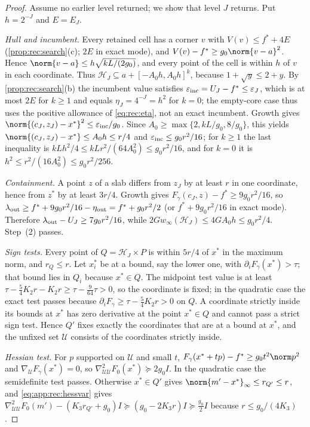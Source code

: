 \begin{proof}
Assume no earlier level returned; we show that level $J$ returns. Put
$h=2^{-J}$ and $E=E_J$.

\emph{Hull and incumbent.} Every retained cell has a corner $v$ with
$V(v)\le f^*+4E$ (\cref{prop:rec:search}(c); $2E$ in exact mode), and
$V(v)-f^*\ge g_0\norm{v-a}^2$. Hence
$\norm{v-a}\le h\sqrt{kL/(2g_0)}$, and every point of the cell is within
$h$ of $v$ in each coordinate. Thus $\mathcal H_J\subseteq a+[-A_0h,A_0h]^k$,
because $1+\sqrt y\le2+y$. By \cref{prop:rec:search}(b) the incumbent
value satisfies $\varepsilon_{\rm inc}=U_J-f^*\le\varepsilon_J$, which is at
most $2E$ for $k\ge1$ and equals $\eta_J=4^{-J}=h^2$ for $k=0$; the empty-core
case thus uses the positive allowance of \eqref{eq:rec:eta}, not an exact
incumbent. Growth gives
$\norm{(c_J,z_J)-x^*}^2\le\varepsilon_{\rm inc}/g_0$. Since
$A_0\ge\max\{2,kL/g_0,8/g_0\}$, this yields $\norm{(c_J,z_J)-x^*}\le A_0h\le r/4$
and $\varepsilon_{\rm inc}\le g_0r^2/16$; for $k\ge1$ the last inequality is
$kLh^2/4\le kLr^2/(64A_0^2)\le g_0r^2/16$, and for $k=0$ it is
$h^2\le r^2/(16A_0^2)\le g_0r^2/256$.

\emph{Containment.} A point $z$ of a slab differs from $z_J$ by at least $r$
in one coordinate, hence from $z^*$ by at least $3r/4$. Growth gives
$F_\gamma(c_J,z)-f^*\ge9g_0r^2/16$, so
$\lambda_{\rm out}\ge f^*+9g_0r^2/16-\eta_{\rm out}=f^*+g_0r^2/2$ (or
$f^*+9g_0r^2/16$ in exact mode). Therefore
$\lambda_{\rm out}-U_J\ge7g_0r^2/16$, while
$2Gw_\infty(\mathcal H_J)\le4GA_0h\le g_0r^2/4$. Step~(2) passes.

\emph{Sign tests.} Every point of $Q=\mathcal H_J\times P$ is within $5r/4$
of $x^*$ in the maximum norm, and $r_Q\le r$. Let $x^*_i$ be at a bound, say
the lower one, with $\partial_iF_\gamma(x^*)>\tau$; that bound lies in
$Q_i$ because $x^*\in Q$. The midpoint test value is at least
$\tau-\frac54K_2r-K_2r\ge\tau-\frac9{64}\tau>0$, so the coordinate is fixed;
in the quadratic case the exact test passes because $\partial_iF_\gamma\ge
\tau-\frac54K_2r>0$ on $Q$. A coordinate strictly inside its bounds at $x^*$
has zero derivative at the point $x^*\in Q$ and cannot pass a strict sign
test. Hence $Q'$ fixes exactly the coordinates that are at a bound at $x^*$,
and the unfixed set $\mathcal U$ consists of the coordinates strictly inside.

\emph{Hessian test.} For $p$ supported on $\mathcal U$ and small $t$,
$F_\gamma(x^*+tp)-f^*\ge g_0t^2\norm p^2$ and $\nabla_{\mathcal U}F_\gamma(x^*)=0$,
so $\nabla^2_{\mathcal U\mathcal U}F_0(x^*)\succeq2g_0I$. In the quadratic case
the semidefinite test passes. Otherwise $x^*\in Q'$ gives
$\norm{m'-x^*}_\infty\le r_{Q'}\le r$, and \eqref{eq:app:rec:hessvar} gives
$\nabla^2_{\mathcal U\mathcal U}F_0(m')-(K_3r_{Q'}+g_0)I\succeq
(g_0-2K_3r)I\succeq\frac{g_0}2I$ because $r\le g_0/(4K_3)$.
\end{proof}

